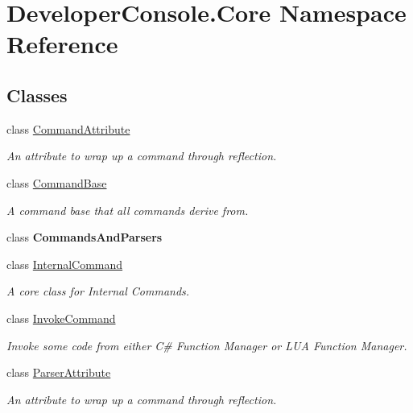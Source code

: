 \hypertarget{namespace_developer_console_1_1_core}{}\section{Developer\+Console.\+Core Namespace Reference}
\label{namespace_developer_console_1_1_core}
\subsection*{Classes}
\begin{DoxyCompactItemize}
\item 
class \hyperlink{class_developer_console_1_1_core_1_1_command_attribute}{Command\+Attribute}
\begin{DoxyCompactList}\small\item\em An attribute to wrap up a command through reflection. \end{DoxyCompactList}\item 
class \hyperlink{class_developer_console_1_1_core_1_1_command_base}{Command\+Base}
\begin{DoxyCompactList}\small\item\em A command base that all commands derive from. \end{DoxyCompactList}\item 
class {\bfseries Commands\+And\+Parsers}
\item 
class \hyperlink{class_developer_console_1_1_core_1_1_internal_command}{Internal\+Command}
\begin{DoxyCompactList}\small\item\em A core class for Internal Commands. \end{DoxyCompactList}\item 
class \hyperlink{class_developer_console_1_1_core_1_1_invoke_command}{Invoke\+Command}
\begin{DoxyCompactList}\small\item\em Invoke some code from either C\# Function Manager or L\+UA Function Manager. \end{DoxyCompactList}\item 
class \hyperlink{class_developer_console_1_1_core_1_1_parser_attribute}{Parser\+Attribute}
\begin{DoxyCompactList}\small\item\em An attribute to wrap up a command through reflection. \end{DoxyCompactList}\end{DoxyCompactItemize}
